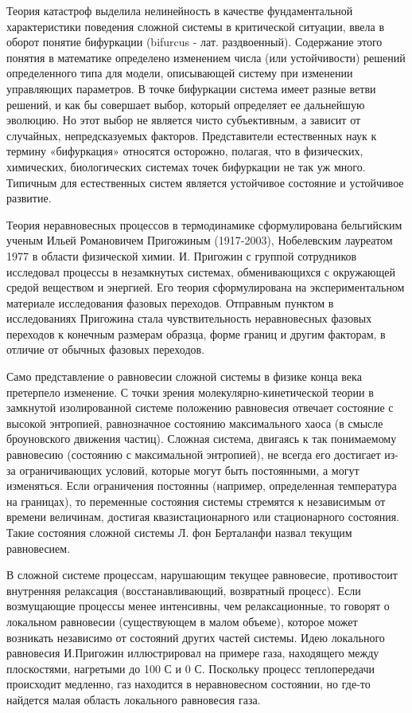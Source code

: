 \documentclass[exam_answers.tex]{subfiles}
\begin{document}
Теория катастроф выделила нелинейность в качестве фундаментальной
характеристики поведения сложной системы в критической ситуации, ввела в
оборот понятие бифуркации (bifurcus - лат. раздвоенный). Содержание этого
понятия в математике определено изменением числа (или устойчивости)
решений определенного типа для модели, описывающей систему при
изменении управляющих параметров. В точке бифуркации система имеет
разные ветви решений, и как бы совершает выбор, который определяет ее
дальнейшую эволюцию. Но этот выбор не является чисто субъективным, а
зависит от случайных, непредсказуемых факторов. Представители
естественных наук к термину «бифуркация» относятся осторожно, полагая, что
в физических, химических, биологических системах точек бифуркации не так
уж много. Типичным для естественных систем является устойчивое состояние и
устойчивое развитие.

Теория неравновесных процессов в термодинамике сформулирована
бельгийским ученым Ильей Романовичем Пригожиным (1917-2003),
Нобелевским лауреатом 1977 в области физической химии. И. Пригожин с
группой сотрудников исследовал процессы в незамкнутых системах,
обменивающихся с окружающей средой веществом и энергией. Его теория
сформулирована на экспериментальном материале исследования фазовых
переходов. Отправным пунктом в исследованиях Пригожина стала
чувствительность неравновесных фазовых переходов к конечным размерам
образца, форме границ и другим факторам, в отличие от обычных фазовых
переходов.

Само представление о равновесии сложной системы в физике конца века
претерпело изменение. С точки зрения молекулярно-кинетической теории в
замкнутой изолированной системе положению равновесия отвечает состояние с
высокой энтропией, равнозначное состоянию максимального хаоса (в смысле
броуновского движения частиц). Сложная система, двигаясь к так понимаемому
равновесию (состоянию с максимальной энтропией), не всегда его достигает из-за
ограничивающих условий, которые могут быть постоянными, а могут
изменяться. Если ограничения постоянны (например, определенная
температура на границах), то переменные состояния системы стремятся к
независимым от времени величинам, достигая квазистационарного или
стационарного состояния. Такие состояния сложной системы Л. фон
Берталанфи назвал текущим равновесием.

В сложной системе процессам, нарушающим текущее равновесие,
противостоит внутренняя релаксация (восстанавливающий, возвратный
процесс). Если возмущающие процессы менее интенсивны, чем
релаксационные, то говорят о локальном равновесии (существующем в малом
объеме), которое может возникать независимо от состояний других частей
системы. Идею локального равновесия И.Пригожин иллюстрировал на примере
газа, находящего между плоскостями, нагретыми до 100 С и 0 С. Поскольку
процесс теплопередачи происходит медленно, газ находится в неравновесном
состоянии, но где-то найдется малая область локального равновесия газа.
\end{document}
